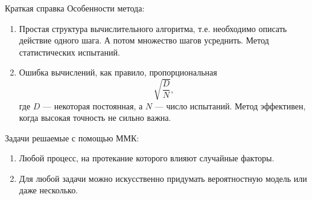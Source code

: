 \documentclass{beamer}
\begin{document}
	\begin{frame}{Краткая справка}
		Особенности метода:
		\begin{enumerate}
			\item 
			Простая структура вычислительного алгоритма, т.е. необходимо описать действие одного шага.
			А потом множество шагов усреднить.
			Метод статистических испытаний.
			\item
			Ошибка вычислений, как правило, пропорциональная 
			$$\sqrt{\frac{D}{N}},$$ 
			где $D$ --- некоторая постоянная, а $N$ --- число испытаний.
			Метод эффективен, когда высокая точность не сильно важна.
			
		\end{enumerate}
		
		Задачи решаемые с помощью ММК:
		\begin{enumerate}
			\item
			Любой процесс, на протекание которого влияют случайные факторы.
			\item 
			Для любой задачи можно искусственно придумать вероятностную модель или даже несколько.
		\end{enumerate}		
	\end{frame}
\end{document}
